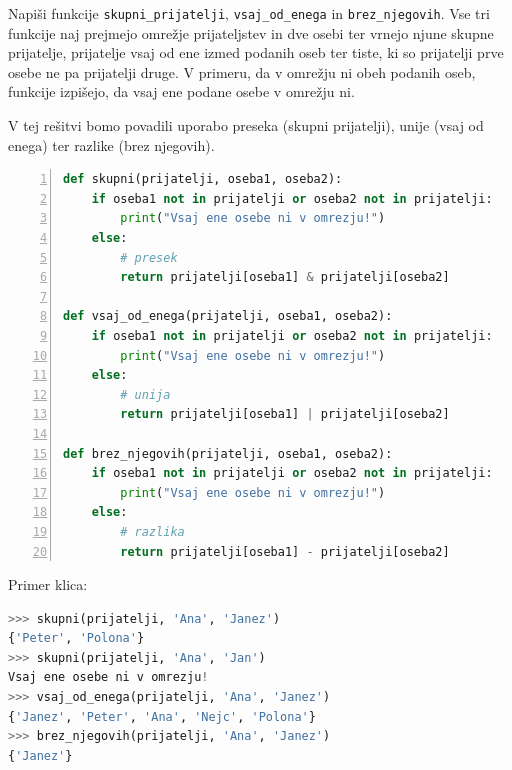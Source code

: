 \begin{zgled}
Napiši funkcije \texttt{skupni\_prijatelji}, \texttt{vsaj\_od\_enega} in \texttt{brez\_njegovih}. Vse tri funkcije naj prejmejo omrežje prijateljstev in dve osebi ter vrnejo njune skupne prijatelje, prijatelje vsaj od ene izmed podanih oseb ter tiste, ki so prijatelji prve osebe ne pa prijatelji druge. V primeru, da v omrežju ni obeh podanih oseb, funkcije izpišejo, da vsaj ene podane osebe v omrežju ni.
\end{zgled}
\begin{resitev}
V tej rešitvi bomo povadili uporabo preseka (skupni prijatelji), unije (vsaj od enega) ter razlike (brez njegovih). 
\begin{lstlisting}[language=Python,numbers=left]
def skupni(prijatelji, oseba1, oseba2):
    if oseba1 not in prijatelji or oseba2 not in prijatelji:
        print("Vsaj ene osebe ni v omrezju!")
    else:
        # presek
        return prijatelji[oseba1] & prijatelji[oseba2]

def vsaj_od_enega(prijatelji, oseba1, oseba2):
    if oseba1 not in prijatelji or oseba2 not in prijatelji:
        print("Vsaj ene osebe ni v omrezju!")
    else:
        # unija
        return prijatelji[oseba1] | prijatelji[oseba2]

def brez_njegovih(prijatelji, oseba1, oseba2):
    if oseba1 not in prijatelji or oseba2 not in prijatelji:
        print("Vsaj ene osebe ni v omrezju!")
    else:
        # razlika
        return prijatelji[oseba1] - prijatelji[oseba2]
\end{lstlisting}
Primer klica:
\begin{lstlisting}[language=Python]
>>> skupni(prijatelji, 'Ana', 'Janez')
{'Peter', 'Polona'}
>>> skupni(prijatelji, 'Ana', 'Jan')
Vsaj ene osebe ni v omrezju!
>>> vsaj_od_enega(prijatelji, 'Ana', 'Janez')
{'Janez', 'Peter', 'Ana', 'Nejc', 'Polona'}
>>> brez_njegovih(prijatelji, 'Ana', 'Janez')
{'Janez'}
\end{lstlisting}
\end{resitev}


